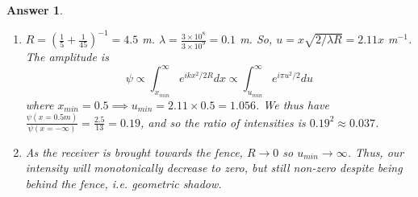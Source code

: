 \documentclass[a4paper]{article}
\newtheorem{ans}{Answer}[subsection]
\theoremstyle{new}
\begin{document}
\begin{ans}
\begin{enumerate}[label=(\roman*)]
$$s+r=\sqrt{a^2+x^2+y^2}+\sqrt{b^2+x^2+y^2}\approx a+b+\frac{1}{2}\bigg(\frac{1}{a}+\frac{1}{b}\bigg)(x^2+y^2)$$
where $a+b$ is a constant and let $\frac{1}{R}:=\frac{1}{a}+\frac{1}{b}$.
\item $R=(\frac{1}{5}+\frac{1}{45})^{-1}=4.5$ m. $\lambda=\frac{3\times10^8}{3\times10^9}=0.1$ m. So, $u=x\sqrt{2/\lambda R}=2.11x$ m$^{-1}$. The amplitude is
$$\psi\propto\int_{x_{min}}^\infty e^{ikx^2/2R}dx\propto\int_{u_{min}}^\infty e^{i\pi u^2/2}du$$
where $x_{min}=0.5\implies u_{min}=2.11\times 0.5=1.056$. We thus have $\frac{\psi(x=0.5 m)}{\psi(x=-\infty)}=\frac{2.5}{13}=0.19$, and so the ratio of intensities is $0.19^2\approx 0.037$.
\item As the receiver is brought towards the fence, $R\rightarrow 0$ so $u_{min}\rightarrow\infty$. Thus, our intensity will monotonically decrease to zero, but still non-zero despite being behind the fence, i.e. geometric shadow.
\end{enumerate}
\end{ans}
\newpage
\end{document}
